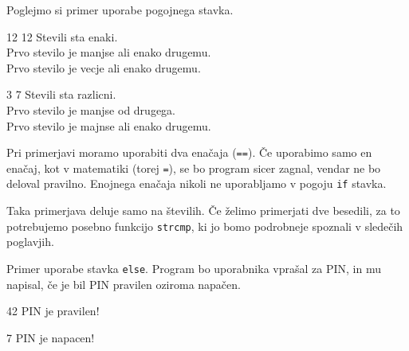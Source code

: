 \documentclass{book}
\begin{document}
\begin{examples}

Poglejmo si primer uporabe pogojnega stavka.


\begin{inout}
12 12
\tcblower
Stevili sta enaki.\\
Prvo stevilo je manjse ali enako drugemu.\\
Prvo stevilo je vecje ali enako drugemu.
\end{inout}

\begin{inout}
3 7
\tcblower
Stevili sta razlicni.\\
Prvo stevilo je manjse od drugega.\\
Prvo stevilo je majnse ali enako drugemu.
\end{inout}

\end{examples}


\begin{errors}
  Pri primerjavi moramo uporabiti dva enačaja (\verb+==+). Če uporabimo samo
  en enačaj, kot v matematiki (torej \verb+=+), se bo program sicer zagnal,
  vendar ne bo deloval pravilno.
  Enojnega enačaja nikoli ne uporabljamo v pogoju \verb+if+ stavka.
\end{errors}

\begin{errors}
  Taka primerjava deluje samo na številih. Če želimo primerjati dve besedili,
  za to potrebujemo posebno funkcijo \verb+strcmp+, ki jo bomo
  podrobneje spoznali v sledečih poglavjih.
\end{errors}

\begin{examples}

Primer uporabe stavka \verb+else+. Program bo uporabnika vprašal za PIN,
in mu napisal, če je bil PIN pravilen oziroma napačen.


\begin{inout}
42
\tcblower
PIN je pravilen!
\end{inout}

\begin{inout}
7
\tcblower
PIN je napacen!
\end{inout}

\end{examples}
\end{document}
